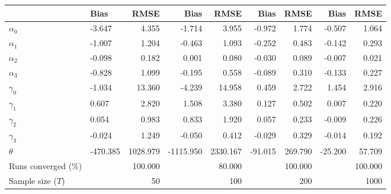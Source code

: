 
\begin{tabular}[t]{llrrrrrrr}
\toprule
  & Bias & RMSE & Bias & RMSE & Bias & RMSE & Bias & RMSE\\
\midrule
$\alpha_{0}$ & -3.647 & 4.355 & -1.714 & 3.955 & -0.972 & 1.774 & -0.507 & 1.064\\
$\alpha_{1}$ & -1.007 & 1.204 & -0.463 & 1.093 & -0.252 & 0.483 & -0.142 & 0.293\\
$\alpha_{2}$ & -0.098 & 0.182 & 0.001 & 0.080 & -0.030 & 0.089 & -0.007 & 0.021\\
$\alpha_{3}$ & -0.828 & 1.099 & -0.195 & 0.558 & -0.089 & 0.310 & -0.133 & 0.227\\
$\gamma_{0}$ & -1.034 & 13.360 & -4.239 & 14.958 & 0.459 & 2.722 & 1.454 & 2.916\\
$\gamma_{1}$ & 0.607 & 2.820 & 1.508 & 3.380 & 0.127 & 0.502 & 0.007 & 0.220\\
$\gamma_{2}$ & 0.054 & 0.983 & 0.833 & 1.920 & 0.057 & 0.233 & -0.009 & 0.226\\
$\gamma_{3}$ & -0.024 & 1.249 & -0.050 & 0.412 & -0.029 & 0.329 & -0.014 & 0.192\\
$\theta$ & -470.385 & 1028.979 & -1115.950 & 2330.167 & -91.015 & 269.790 & -25.200 & 57.709\\
Runs converged (\%) &  & 100.000 &  & 80.000 &  & 100.000 &  & 100.000\\
Sample size ($T$) &  & 50 &  & 100 &  & 200 &  & 1000\\
\bottomrule
\end{tabular}
